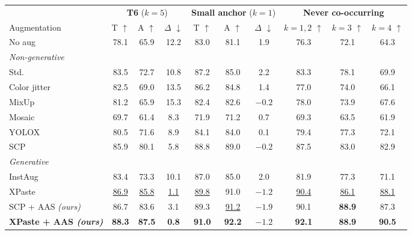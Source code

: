 \begin{tabular}{l ccc ccc ccc}
\toprule
& \multicolumn{3}{c}{\textbf{T6} ($k{=}5$)} & \multicolumn{3}{c}{\textbf{Small anchor} ($k{=}1$)} & \multicolumn{3}{c}{\textbf{Never co-occurring}} \\
\cmidrule(lr){2-4} \cmidrule(lr){5-7} \cmidrule(lr){8-10}
Augmentation & T $\uparrow$ & A $\uparrow$ & $\Delta$ $\downarrow$ & T $\uparrow$ & A $\uparrow$ & $\Delta$ $\downarrow$ & $k{=}1,2$ $\uparrow$ & $k{=}3$ $\uparrow$ & $k{=}4$ $\uparrow$ \\
\midrule
No aug & 78.1 & 65.9 & 12.2 & 83.0 & 81.1 & 1.9 & 76.3 & 72.1 & 64.3 \\
\midrule
\multicolumn{10}{l}{\emph{Non-generative}} \\
Std. & 83.5 & 72.7 & 10.8 & 87.2 & 85.0 & 2.2 & 83.3 & 78.1 & 69.9 \\
Color jitter & 82.5 & 69.0 & 13.5 & 86.2 & 84.8 & 1.4 & 77.0 & 74.0 & 66.1 \\
MixUp & 81.2 & 65.9 & 15.3 & 82.4 & 82.6 & $-0.2$ & 78.0 & 73.9 & 67.6 \\
Mosaic & 69.7 & 61.4 & 8.3 & 71.9 & 71.2 & 0.7 & 69.3 & 63.5 & 61.9 \\
YOLOX & 80.5 & 71.6 & 8.9 & 84.1 & 84.0 & 0.1 & 79.4 & 77.3 & 72.1 \\
SCP & 85.9 & 80.1 & 5.8 & 88.8 & 89.0 & $-0.2$ & 87.5 & 83.0 & 82.9 \\
\midrule
\multicolumn{10}{l}{\emph{Generative}} \\
InstAug & 83.4 & 73.3 & 10.1 & 87.0 & 85.0 & 2.0 & 81.9 & 77.3 & 71.1 \\
XPaste & \underline{86.9} & \underline{85.8} & \underline{1.1} & \underline{89.8} & 91.0 & \underline{$-1.2$} & \underline{90.4} & \underline{86.1} & \underline{88.1} \\
\midrule
\rowcolor{oursrow} SCP + AAS \emph{(ours)} & 86.7 & 83.6 & 3.1 & 89.3 & \underline{91.2} & \textbf{\boldmath $-1.9$} & 90.1 & \textbf{88.9} & 87.3 \\
\rowcolor{oursrow} \textbf{XPaste + AAS \emph{(ours)}} & \textbf{88.3} & \textbf{87.5} & \textbf{0.8} & \textbf{91.0} & \textbf{92.2} & \underline{$-1.2$} & \textbf{92.1} & \textbf{88.9} & \textbf{90.5} \\
\bottomrule
\end{tabular}

